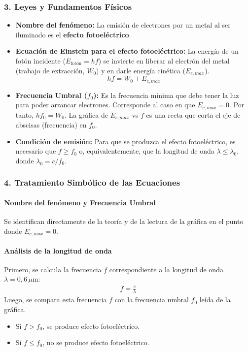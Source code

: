 \subsubsection*{3. Leyes y Fundamentos Físicos}
\begin{itemize}
    \item \textbf{Nombre del fenómeno:} La emisión de electrones por un metal al ser iluminado es el \textbf{efecto fotoeléctrico}.
    \item \textbf{Ecuación de Einstein para el efecto fotoeléctrico:} La energía de un fotón incidente ($E_{\text{fotón}} = hf$) se invierte en liberar al electrón del metal (trabajo de extracción, $W_0$) y en darle energía cinética ($E_{c,max}$).
    $$ hf = W_0 + E_{c,max} $$
    \item \textbf{Frecuencia Umbral ($f_0$):} Es la frecuencia mínima que debe tener la luz para poder arrancar electrones. Corresponde al caso en que $E_{c,max}=0$. Por tanto, $hf_0 = W_0$. La gráfica de $E_{c,max}$ vs $f$ es una recta que corta el eje de abscisas (frecuencia) en $f_0$.
    \item \textbf{Condición de emisión:} Para que se produzca el efecto fotoeléctrico, es necesario que $f \ge f_0$ o, equivalentemente, que la longitud de onda $\lambda \le \lambda_0$, donde $\lambda_0 = c/f_0$.
\end{itemize}

\subsubsection*{4. Tratamiento Simbólico de las Ecuaciones}
\paragraph{Nombre del fenómeno y Frecuencia Umbral}
Se identifican directamente de la teoría y de la lectura de la gráfica en el punto donde $E_{c,max} = 0$.

\paragraph{Análisis de la longitud de onda}
Primero, se calcula la frecuencia $f$ correspondiente a la longitud de onda $\lambda=0,6\,\mu\text{m}$:
\begin{gather}
    f = \frac{c}{\lambda}
\end{gather}
Luego, se compara esta frecuencia $f$ con la frecuencia umbral $f_0$ leída de la gráfica.
\begin{itemize}
    \item Si $f > f_0$, se produce efecto fotoeléctrico.
    \item Si $f \le f_0$, no se produce efecto fotoeléctrico.
\end{itemize}

